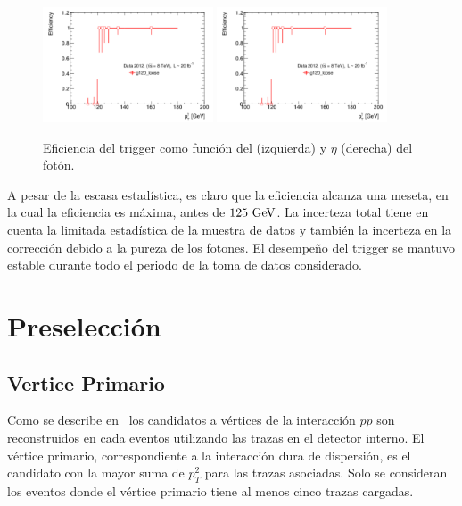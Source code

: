 \begin{figure}[!htbp]
  \centering
  \includegraphics[width=0.45\textwidth]{figures/EffPtg120_loose}
  \includegraphics[width=0.45\textwidth]{figures/EffPtg120_loose}
  \caption{Eficiencia del trigger {\trigchain} como función del {\pt} (izquierda)
    y $\eta$ (derecha) del fotón.}
  \label{fig:trigger_perf}
\end{figure}

A pesar de la escasa estadística, es claro que la eficiencia alcanza una meseta,
en la cual la eficiencia es máxima, antes de $125 \gev$. La incerteza total
tiene en cuenta la limitada estadística de la muestra de datos y también la
incerteza en la corrección debido a la pureza de los fotones. El desempeño del
trigger se mantuvo estable durante todo el periodo de la toma de datos
considerado.



\section{Preselección}\label{sec:base_seleccion}

\subsection{Vertice Primario}

Como se describe en \XXX\ los candidatos a vértices de la interacción $pp$ son
reconstruidos en cada eventos utilizando las trazas en el detector interno. El
vértice primario, correspondiente a la interacción dura de dispersión, es el
candidato con la mayor suma de $p_{T}^{2}$ para las trazas asociadas. Solo se
consideran los eventos donde el vértice primario tiene al menos cinco trazas
cargadas. 



